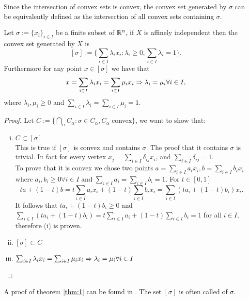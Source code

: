 \documentclass[../1.tex]{subfiles}
\begin{document}
    Since the intersection of convex sets is convex, the convex set generated by $\sigma$ can be equivalently defined as the intersection 
    of all convex sets containing $\sigma$.

    \begin{thm}
        Let $\sigma := \{x_i\}_{i \in I}$ be a finite subset of $\mathbb{R}^n$, if $X$ is affinely independent then the convex set generated by $X$ is 
        \[ [\sigma] := \{ \sum_{i \in I} \lambda_i x_i : \lambda_i \geq 0, \sum_{i \in I} \lambda_i = 1\}. \]
        Furthermore for any point $x \in [\sigma]$ we have that
        \[ x = \sum_{i \in I} \lambda_i x_i = \sum_{i \in I} \mu_i x_i \Rightarrow \lambda_i = \mu_i \forall i \in I, \] 
        where $\lambda_i,\mu_i \geq 0$ and $\sum_{i \in I} \lambda_i = \sum_{i \in I} \mu_i =1$.
        \label{thm:1}
    \end{thm}

    \begin{proof}
        Let $C := \{ \bigcap_\alpha C_\alpha : \sigma \in C_\alpha, C_\alpha$ convex$\}$, we want to show that:
        \begin{enumerate}[(i)]
            \item $C \subset [\sigma]$\\
            This is true if $[\sigma]$ is convex and contains $\sigma$.
            The proof that it contains $\sigma$ is trivial. In fact for every vertex $x_j = \sum_{i \in I} \delta_{ij} x_i$,
            and $\sum_{i \in I}\delta_{ij} = 1$.\\
            To prove that it is convex we chose two points $a = \sum_{i \in I} a_i x_i, b = \sum_{i \in I} b_i x_i$ where $a_i,b_i \geq 0 \forall i \in I$
            and $\sum_{i \in I} a_i = \sum_{i \in I} b_i = 1$. For $t \in [0,1]$
            \[ ta+(1-t)b = t\sum_{i \in I} a_i x_i + (1-t) \sum_{i \in I} b_i x_i = \sum_{i \in I} (ta_i + (1-t)b_i)x_i.\]
            It follows that $ta_i + (1-t)b_i \geq 0$ and $\sum_{i \in I} (ta_i + (1-t)b_i) = t\sum_{i \in I}a_i + (1-t)\sum_{i \in I}b_i = 1$ for all $i \in I$,
            therefore (i) is proven.

            \item $[\sigma] \subset C$
            \item $\sum_{i \in I} \lambda_i x_i = \sum_{i \in I} \mu_i x_i \Rightarrow \lambda_i = \mu_i \forall i \in I$
        \end{enumerate}
    \end{proof}

    A proof of theorem \ref{thm:1} can be found in \cite{singerthorpe}.
    The set $[\sigma]$ is often called  of $\sigma$.
    
\end{document}
